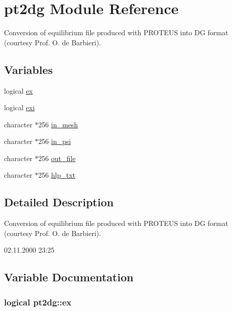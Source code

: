 \hypertarget{namespacept2dg}{
\section{pt2dg Module Reference}
\label{namespacept2dg}
}
Conversion of equilibrium file produced with PROTEUS into DG format (courtesy Prof. O. de Barbieri).  


\subsection*{Variables}
\begin{CompactItemize}
\item 
logical \hyperlink{namespacept2dg_a7bbc2ad42320beb17f6b9b32d04782a}{ex}
\item 
logical \hyperlink{namespacept2dg_8d34f10ebcb05cf92fd9c45ef5fd2d21}{exi}
\item 
character $\ast$256 \hyperlink{namespacept2dg_eda9f0cb998f1a0f90278f6e346b0078}{in\_\-mesh}
\item 
character $\ast$256 \hyperlink{namespacept2dg_a7a9a6418c143ad919a63ee5a58cd4a9}{in\_\-psi}
\item 
character $\ast$256 \hyperlink{namespacept2dg_33730b097575dd7213ab08bcf86ffb0b}{out\_\-file}
\item 
character $\ast$256 \hyperlink{namespacept2dg_33f7cd692337d17317294fdb06b21913}{hlp\_\-txt}
\end{CompactItemize}


\subsection{Detailed Description}
Conversion of equilibrium file produced with PROTEUS into DG format (courtesy Prof. O. de Barbieri). 

\begin{Desc}
\item[Version:]02.11.2000 23:25 \end{Desc}


\subsection{Variable Documentation}
\hypertarget{namespacept2dg_a7bbc2ad42320beb17f6b9b32d04782a}{
\subsubsection[ex]{\setlength{\rightskip}{0pt plus 5cm}logical {\bf pt2dg::ex}}}
\label{namespacept2dg_a7bbc2ad42320beb17f6b9b32d04782a}




